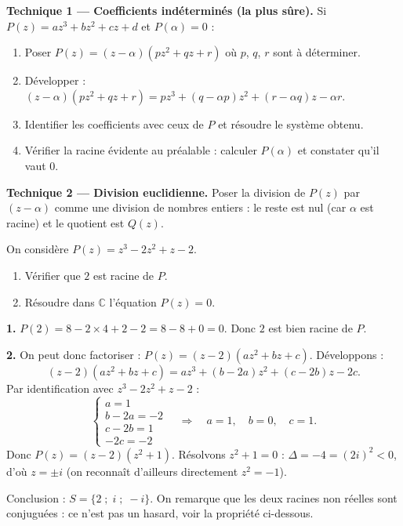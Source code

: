 \documentclass[11pt]{article}
\begin{document}
\begin{methode}
\textbf{Technique 1 — Coefficients indéterminés (la plus sûre).} Si $P(z) = az^3 + bz^2 + cz + d$ et $P(\alpha) = 0$ :
\begin{enumerate}
\item Poser $P(z) = (z - \alpha)(pz^2 + qz + r)$ où $p$, $q$, $r$ sont à déterminer.
\item Développer : $(z-\alpha)(pz^2 + qz + r) = pz^3 + (q - \alpha p)z^2 + (r - \alpha q)z - \alpha r$.
\item Identifier les coefficients avec ceux de $P$ et résoudre le système obtenu.
\item Vérifier la racine évidente au préalable : calculer $P(\alpha)$ et constater qu'il vaut $0$.
\end{enumerate}
\textbf{Technique 2 — Division euclidienne.} Poser la division de $P(z)$ par $(z - \alpha)$ comme une division de nombres entiers : le reste est nul (car $\alpha$ est racine) et le quotient est $Q(z)$.
\end{methode}

\begin{exoresolu}[Résolution de $z^3 - 2z^2 + z - 2 = 0$]
On considère $P(z) = z^3 - 2z^2 + z - 2$.
\begin{enumerate}
\item Vérifier que $2$ est racine de $P$.
\item Résoudre dans $\mathbb{C}$ l'équation $P(z) = 0$.
\end{enumerate}
\tcblower
\textbf{1.} $P(2) = 8 - 2 \times 4 + 2 - 2 = 8 - 8 + 0 = 0$. Donc $2$ est bien racine de $P$.

\textbf{2.} On peut donc factoriser : $P(z) = (z - 2)(az^2 + bz + c)$. Développons :
\[ (z-2)(az^2 + bz + c) = az^3 + (b - 2a)z^2 + (c - 2b)z - 2c. \]
Par identification avec $z^3 - 2z^2 + z - 2$ :
\[ \begin{cases} a = 1 \\ b - 2a = -2 \\ c - 2b = 1 \\ -2c = -2 \end{cases} \quad \Longrightarrow \quad a = 1,\quad b = 0,\quad c = 1. \]
Donc $P(z) = (z - 2)(z^2 + 1)$. Résolvons $z^2 + 1 = 0$ : $\Delta = -4 = (2i)^2 < 0$, d'où $z = \pm i$ (on reconnaît d'ailleurs directement $z^2 = -1$).

Conclusion : $S = \{2 \; ; \; i \; ; \; -i\}$. On remarque que les deux racines non réelles sont conjuguées : ce n'est pas un hasard, voir la propriété ci-dessous.
\end{exoresolu}
\end{document}
